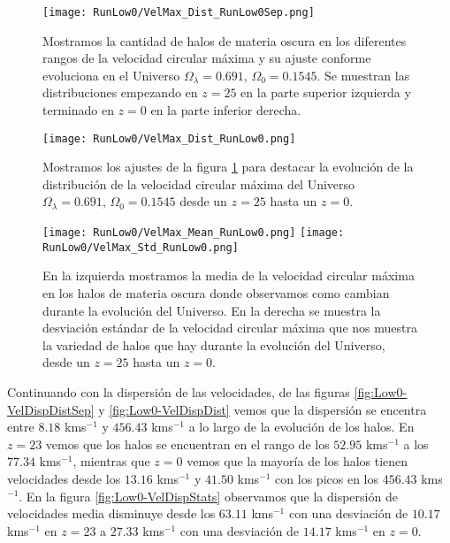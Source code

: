 \begin{figure}[H]
    \centering
    \texttt{[image: RunLow0/VelMax\_Dist\_RunLow0Sep.png]}
    \caption[Velocidad circular máxima]{\footnotesize Mostramos la cantidad de halos de materia oscura en los diferentes rangos de la velocidad circular máxima y su ajuste conforme evoluciona en el Universo $\Omega_\lambda = 0.691$, $\Omega_0 = 0.1545$. Se muestran las distribuciones empezando en $z=25$ en la parte superior izquierda y terminado en $z=0$ en la parte inferior derecha.}
    \label{fig:Low0-VelMaxDistSep}
\end{figure}

\begin{figure}[H]
    \centering
    \texttt{[image: RunLow0/VelMax\_Dist\_RunLow0.png]}
    \caption[Distribución de la velocidad circular máxima]{\footnotesize Mostramos los ajustes de la figura \ref{fig:Low0-VelMaxDistSep} para destacar la evolución de la distribución de la velocidad circular máxima del Universo $\Omega_\lambda = 0.691$, $\Omega_0 = 0.1545$ desde un $z=25$ hasta un $z=0$.}
    \label{fig:Low0-VelMaxDist}
\end{figure}

\begin{figure}[H]
    \centering
    \texttt{[image: RunLow0/VelMax\_Mean\_RunLow0.png]}
    \texttt{[image: RunLow0/VelMax\_Std\_RunLow0.png]}
    \caption[Media y desviación estándar de la velocidad circular máxima]{\footnotesize En la izquierda mostramos la media de la velocidad circular máxima en los halos de materia oscura donde observamos como cambian durante la evolución del Universo. En la derecha se muestra la desviación estándar de la velocidad circular máxima que nos muestra la variedad de halos que hay durante la evolución del Universo, desde un $z=25$ hasta un $z=0$.}
    \label{fig:Low0-VelMaxStats}
\end{figure}

Continuando con la dispersión de las velocidades, de las figuras \ref{fig:Low0-VelDispDistSep} y \ref{fig:Low0-VelDispDist} vemos que la dispersión se encentra entre $8.18$ kms$^{-1}$ y $456.43$ kms$^{-1}$ a lo largo de la evolución de los halos. En $z=23$ vemos que los halos se encuentran en el rango de los $52.95$ kms$^{-1}$ a los $77.34$ kms$^{-1}$, mientras que $z=0$ vemos que la mayoría de los halos tienen velocidades desde los $13.16$ kms$^{-1}$ y $41.50$ kms$^{-1}$ con los picos en los $456.43$ kms$^{-1}$. En la figura \ref{fig:Low0-VelDispStats} observamos que la dispersión de velocidades media disminuye desde los $63.11$ kms$^{-1}$ con una desviación de $10.17$ kms$^{-1}$ en $z=23$ a $27.33$ kms$^{-1}$ con una desviación de $14.17$ kms$^{-1}$ en $z=0$.

